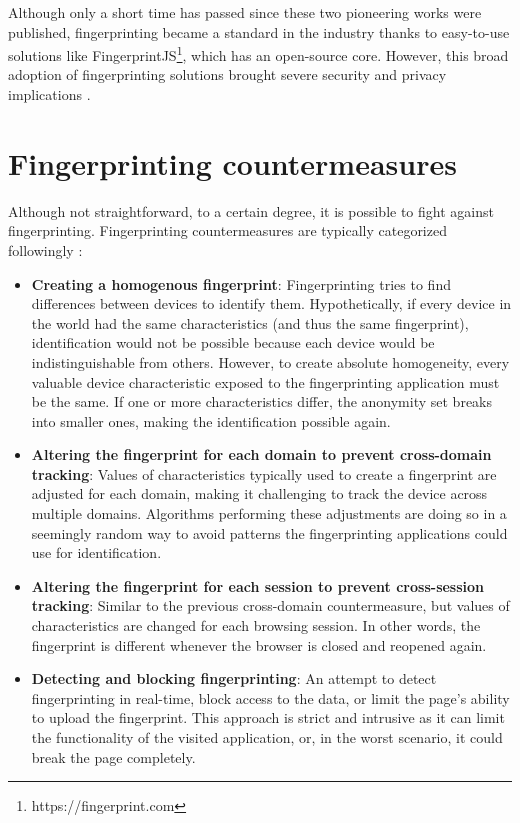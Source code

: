 Although only a short time has passed since these two pioneering works were published, fingerprinting became a standard in the industry thanks to easy-to-use solutions like FingerprintJS\footnote{https://fingerprint.com}, which has an open-source core. However, this broad adoption of fingerprinting solutions brought severe security and privacy implications \cite{WP224Fingerprinting}.

\section{Fingerprinting countermeasures}
\label{Section:FingerprintingCounter}

Although not straightforward, to a certain degree, it is possible to fight against fingerprinting. Fingerprinting countermeasures are typically categorized followingly \cite{JShelterPaper, PriVaricator}:

\begin{itemize}
	\item \textbf{Creating a homogenous fingerprint}: Fingerprinting tries to find differences between devices to identify them. Hypothetically, if every device in the world had the same characteristics (and thus the same fingerprint), identification would not be possible because each device would be indistinguishable from others. However, to create absolute homogeneity, every valuable device characteristic exposed to the fingerprinting application must be the same. If one or more characteristics differ, the anonymity set breaks into smaller ones, making the identification possible again.
	\item \textbf{Altering the fingerprint for each domain to prevent cross-domain tracking}: Values of characteristics typically used to create a fingerprint are adjusted for each domain, making it challenging to track the device across multiple domains. Algorithms performing these adjustments are doing so in a seemingly random way to avoid patterns the fingerprinting applications could use for identification.
	\item \textbf{Altering the fingerprint for each session to prevent cross-session tracking}: Similar to the previous cross-domain countermeasure, but values of characteristics are changed for each browsing session. In other words, the fingerprint is different whenever the browser is closed and reopened again.
	\item \textbf{Detecting and blocking fingerprinting}: An attempt to detect fingerprinting in real-time, block access to the data, or limit the page's ability to upload the fingerprint. This approach is strict and intrusive as it can limit the functionality of the visited application, or, in the worst scenario, it could break the page completely.
\end{itemize}

